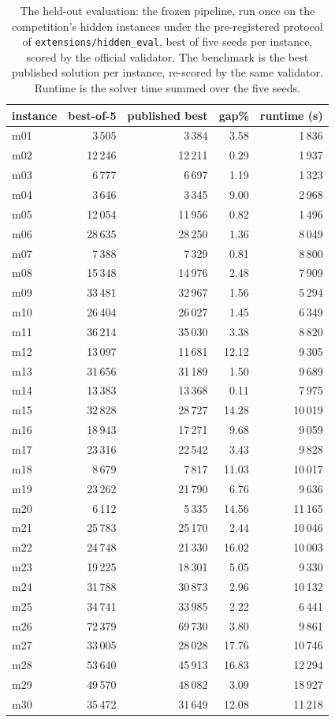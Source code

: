 \begin{table}[!ht]
\caption{The held-out evaluation: the frozen pipeline, run once on the competition's hidden instances under the pre-registered protocol of \texttt{extensions/hidden\_eval}, best of five seeds per instance, scored by the official validator. The benchmark is the best published solution per instance, re-scored by the same validator. Runtime is the solver time summed over the five seeds.}\label{tab:hidden}
\centering\small
\begin{tabular}{@{}lrrrr@{}}
\toprule
instance & best-of-5 & published best & gap\% & runtime (s)\\
\midrule
m01 & 3\,505 & 3\,384 & 3.58 & 1\,836\\
m02 & 12\,246 & 12\,211 & 0.29 & 1\,937\\
m03 & 6\,777 & 6\,697 & 1.19 & 1\,323\\
m04 & 3\,646 & 3\,345 & 9.00 & 2\,968\\
m05 & 12\,054 & 11\,956 & 0.82 & 1\,496\\
m06 & 28\,635 & 28\,250 & 1.36 & 8\,049\\
m07 & 7\,388 & 7\,329 & 0.81 & 8\,800\\
m08 & 15\,348 & 14\,976 & 2.48 & 7\,909\\
m09 & 33\,481 & 32\,967 & 1.56 & 5\,294\\
m10 & 26\,404 & 26\,027 & 1.45 & 6\,349\\
m11 & 36\,214 & 35\,030 & 3.38 & 8\,820\\
m12 & 13\,097 & 11\,681 & 12.12 & 9\,305\\
m13 & 31\,656 & 31\,189 & 1.50 & 9\,689\\
m14 & 13\,383 & 13\,368 & 0.11 & 7\,975\\
m15 & 32\,828 & 28\,727 & 14.28 & 10\,019\\
m16 & 18\,943 & 17\,271 & 9.68 & 9\,059\\
m17 & 23\,316 & 22\,542 & 3.43 & 9\,828\\
m18 & 8\,679 & 7\,817 & 11.03 & 10\,017\\
m19 & 23\,262 & 21\,790 & 6.76 & 9\,636\\
m20 & 6\,112 & 5\,335 & 14.56 & 11\,165\\
m21 & 25\,783 & 25\,170 & 2.44 & 10\,046\\
m22 & 24\,748 & 21\,330 & 16.02 & 10\,003\\
m23 & 19\,225 & 18\,301 & 5.05 & 9\,330\\
m24 & 31\,788 & 30\,873 & 2.96 & 10\,132\\
m25 & 34\,741 & 33\,985 & 2.22 & 6\,441\\
m26 & 72\,379 & 69\,730 & 3.80 & 9\,861\\
m27 & 33\,005 & 28\,028 & 17.76 & 10\,746\\
m28 & 53\,640 & 45\,913 & 16.83 & 12\,294\\
m29 & 49\,570 & 48\,082 & 3.09 & 18\,927\\
m30 & 35\,472 & 31\,649 & 12.08 & 11\,218\\
\bottomrule
\end{tabular}
\end{table}
